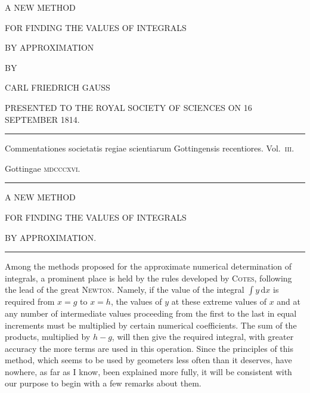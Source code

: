 \clearpage{}\thispagestyle{empty}
\begin{center}
A NEW METHOD

\medskip
FOR FINDING THE VALUES OF INTEGRALS

BY APPROXIMATION

BY

CARL FRIEDRICH GAUSS

PRESENTED TO THE ROYAL SOCIETY OF SCIENCES ON 16 SEPTEMBER 1814.

\par\bigskip\rule{.7\linewidth}{.4pt}\par\medskip
Commentationes societatis regiae scientiarum Gottingensis recentiores. Vol.~\textsc{iii}.

Gottingae \textsc{mdcccxvi}.
\par\medskip\rule{.7\linewidth}{.4pt}
\end{center}
\clearpage{}
\begin{center}
A NEW METHOD

FOR FINDING THE VALUES OF INTEGRALS

BY APPROXIMATION.

\medskip\rule{.1\linewidth}{.4pt}
\end{center}
Among the methods proposed for the approximate numerical determination of integrals, a prominent place is held by the rules developed by \textsc{Cotes}, following the lead of the great \textsc{Newton}. Namely, if the value of the integral $\int y\,\mathrm{d}x$ is required from $x=g$ to $x=h$, the values of $y$ at these extreme values of $x$ and at any number of intermediate values proceeding from the first to the last in equal increments must be multiplied by certain numerical coefficients. The sum of the products, multiplied by $h-g$, will then give the required integral, with greater accuracy the more terms are used in this operation. Since the principles of this method, which seems to be used by geometers less often than it deserves, have nowhere, as far as I know, been explained more fully, it will be consistent with our purpose to begin with a few remarks about them.

